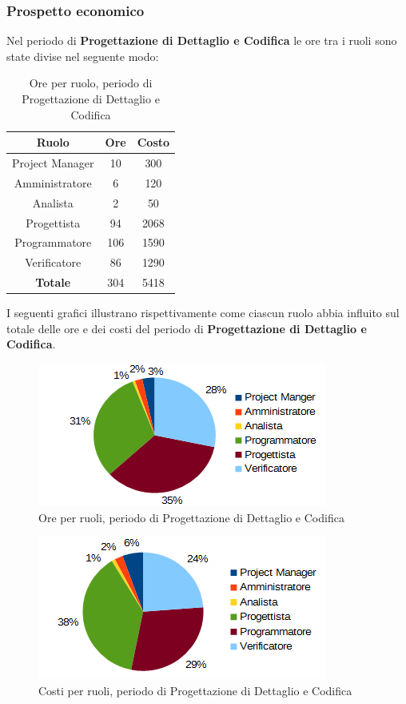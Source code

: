 		\subsubsection{Prospetto economico}
		Nel periodo di \textbf{Progettazione di Dettaglio e Codifica} le ore tra i ruoli sono state divise nel seguente modo: \\
	\begin{table}[H]
		\centering
		\begin{tabular}{|c|c|c|}
			\hline
			\textbf{Ruolo}		& \textbf{Ore}	& \textbf{Costo} \\
			\hline
			Project Manager		& 10			& 300	\\
			Amministratore		& 6				& 120	\\
			Analista			& 2				& 50	\\
			Progettista			& 94			& 2068	\\
			Programmatore		& 106			& 1590	\\
			Verificatore		& 86			& 1290	\\
			\hline
			\textbf{Totale}		& 304			& 5418	\\
			\hline
		\end{tabular}
		\caption{Ore per ruolo, periodo di Progettazione di Dettaglio e Codifica}
		\end{table}
	I seguenti grafici illustrano rispettivamente come ciascun ruolo abbia influito sul totale
delle ore e dei costi del periodo di \textbf{Progettazione di Dettaglio e Codifica}. \\
	\begin{figure}[H]
		\centering
		\includegraphics[scale=1]{immagini/grafici/progettazione_dettaglio_codifica-torta.png}
		\caption{Ore per ruoli, periodo di Progettazione di Dettaglio e Codifica}
	\end{figure}
	\begin{figure}[H]
		\centering
		\includegraphics[scale=1]{immagini/grafici/progettazione_dettaglio_codifica-torta-costo.png}
		\caption{Costi per ruoli, periodo di Progettazione di Dettaglio e Codifica}
	\end{figure}
